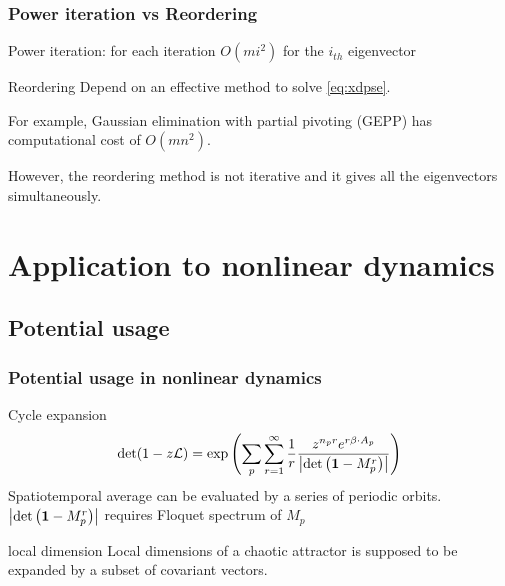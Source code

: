 \documentclass[mathserif, handout]{beamer}
\begin{document}
\begin{frame}
  \frametitle{Power iteration vs Reordering}
  
  \begin{block}{Power iteration: for each iteration}
     $O(mi^{2})$ for the $i_{th}$ eigenvector
  \end{block}

  \pause 

  \begin{block}{Reordering}
    Depend on an effective method to solve \textbf{\pse} \eqref{eq:xdpse}.
    \vspace{0em}

    For
    example, {\color{cyan} Gaussian  elimination with partial pivoting} (GEPP) 
    has computational cost of $O(mn^{2})$. 
  \end{block}
  
  \pause 

  However,  the reordering method is {\color{red} not iterative} and
  it gives all the eigenvectors {\color{red} simultaneously}.
\end{frame}

\section{Application to nonlinear dynamics}

\subsection{Potential usage}
\begin{frame}
  \frametitle{Potential usage in nonlinear dynamics}
  \begin{exampleblock}{Cycle expansion \cite{DasBuch}}
    \[
    \det(1-z{\cal L}) =  \exp \left(
      \sum_{p} \sum_{r=1}^\infty \frac{1}{r}
      \frac{  z^{{n_{p}} r }  e^{r \beta \cdot  A_{p}} }{\left|\det\left({\bf 1}-M_p^{r}\right)\right|}
    \right)
    \]
    {\color{cyan} Spatiotemporal average} can be evaluated
    by a series of periodic orbits. 
    $\left|\det\left({\bf 1}-M_p^{r}\right)\right|$ requires Floquet spectrum of $M_p$
  \end{exampleblock}
  
  \pause

  \begin{exampleblock}{local dimension \cite{ginelli-2007-99}}
    Local dimensions of a chaotic attractor is supposed to be expanded by 
    a {\color{red} subset of covariant vectors}. 
  \end{exampleblock}

\end{frame}
\end{document}
